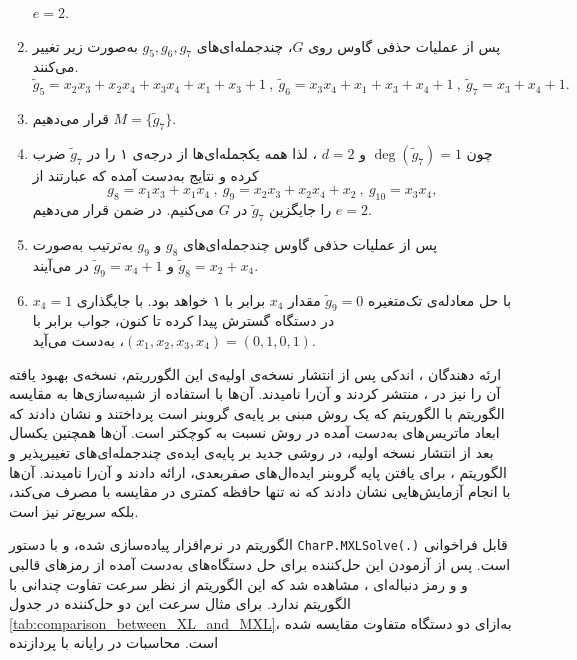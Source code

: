 \begin{example}
\begin{enumerate}
 $e = 2$.
\item
پس از عملیات حذفی گاوس روی 
$G$،
 چندجمله‌ای‌های 
 $g_{5}, g_{6}, g_{7}$
 به‌صورت زیر تغییر می‌کنند. 
 $$\tilde{g}_{5} = x_{2}x_{3} + x_{2}x_{4} + x_{3}x_{4} + x_{1} + x_{3} + 1 \ , \ \tilde{g}_{6} = x_{3}x_{4} + x_{1} + x_{3} + x_{4} + 1 \ , \ \tilde{g}_{7} = x_{3} + x_{4} + 1.$$
\item
قرار می‌دهیم 
$M = \{\tilde{g}_{7}\}$.
\item
چون 
$\deg(\tilde{g}_{7}) = 1$
و
$d = 2$
، لذا همه‌  یکجمله‌ای‌ها از درجه‌ی ۱ را در 
$\tilde{g}_{7}$
ضرب کرده و نتایج به‌دست  آمده که عبارتند از 
$$g_{8} = x_{1}x_{3} + x_{1}x_{4} \ , \ g_{9} = x_{2}x_{3} + x_{2}x_{4} + x_{2} \ , \ g_{10} = x_{3}x_{4},$$
را جایگزین 
$\tilde{g}_{7}$
در 
$G$
می‌کنیم. در ضمن قرار می‌دهیم
$e = 2$.
\item
پس از عملیات حذفی گاوس چندجمله‌ای‌های 
$g_{8}$
و
$g_{9}$
به‌ترتیب به‌صورت 
$\tilde{g}_{8} = x_{2} + x_{4}$
و
$\tilde{g}_{9} = x_{4} + 1$
در می‌آیند. 
\item
با حل معادله‌ی تک‌متغیره‌ 
$\tilde{g}_{9} = 0$
مقدار 
$x_{4}$
برابر با ۱ خواهد بود. با جایگذاری 
$x_{4} = 1$
در دستگاه گسترش پیدا کرده تا کنون، جواب برابر با 
$(x_{1},x_{2},x_{3},x_{4}) = (0,1,0,1)$، 
به‌دست می‌آید. 
\end{enumerate}
ارئه دهندگان 
، اندکی پس از انتشار نسخه‌ی اولیه‌ی این الگورریتم، نسخه‌ی بهبود یافته‌ آن را نیز در  
\cite{mohamed2008mxl2}
، منتشر کردند و آن‌را 
نامیدند. آن‌ها با استفاده از شبیه‌سازی‌ها به مقایسه‌  الگوریتم 
با الگوریتم‌ 
که یک روش مبنی بر پایه‌ی گروبنر است پرداختند و نشان دادند که ابعاد ماتریس‌های به‌دست  آمده در روش 
نسبت به 
کوچکتر است. آن‌ها همچنین یکسال بعد از انتشار نسخه‌  اولیه‌، در 
\cite{mohamed2009mxl3}
روشی جدید بر پایه‌ی ایده‌ی چندجمله‌ای‌های تغییرپذیر و الگوریتم 
، 
 برای یافتن پایه‌  گروبنر ایده‌ال‌های صفربعدی، ارائه دادند و آن‌را 
نامیدند. آن‌ها با انجام آزمایش‌هایی نشان دادند که 
نه‌ تنها حافظه‌  کمتری در مقایسه با  
مصرف می‌کند، بلکه سریع‌تر نیز است.
\end{example}
الگوریتم 
در نرم‌افزار 
\cite{ApCoCoA}
 پیاده‌سازی شده، و با دستور 
 \texttt{CharP.MXLSolve(.)}
قابل فراخوانی است. پس از آزمودن این حل‌کننده برای حل دستگاه‌های به‌دست آمده از رمزهای قالبی 
و 
و  رمز دنباله‌ای 
، 
مشاهده شد که  این الگوریتم از نظر سرعت تفاوت چندانی با الگوریتم 
ندارد.  برای مثال سرعت این دو حل‌کننده در جدول 
\ref{tab:comparison_between_XL_and_MXL}، 
به‌ازای دو دستگاه متفاوت مقایسه شده است. محاسبات در رایانه با پردازنده 
